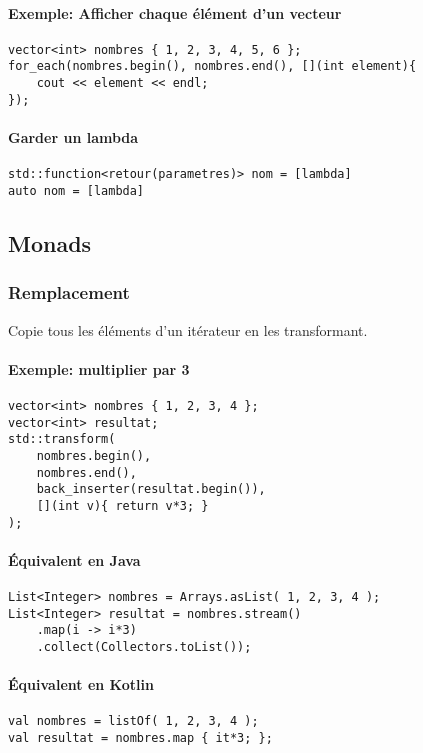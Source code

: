 \documentclass[10pt,a4paper,french]{article}
\begin{document}
\paragraph{Exemple: Afficher chaque élément d'un vecteur}
\begin{verbatim}
vector<int> nombres { 1, 2, 3, 4, 5, 6 };
for_each(nombres.begin(), nombres.end(), [](int element){
    cout << element << endl;
});
\end{verbatim}

\paragraph{Garder un lambda}
\begin{verbatim}
std::function<retour(parametres)> nom = [lambda]
auto nom = [lambda]
\end{verbatim}

\subsection{Monads}

\subsubsection{Remplacement}

Copie tous les éléments d'un itérateur en les transformant.

\paragraph{Exemple: multiplier par 3}
\begin{verbatim}
vector<int> nombres { 1, 2, 3, 4 };
vector<int> resultat;
std::transform(
    nombres.begin(),
    nombres.end(),
    back_inserter(resultat.begin()),
    [](int v){ return v*3; }
);
\end{verbatim}

\paragraph{Équivalent en Java}
\begin{verbatim}
List<Integer> nombres = Arrays.asList( 1, 2, 3, 4 );
List<Integer> resultat = nombres.stream()
    .map(i -> i*3)
    .collect(Collectors.toList());
\end{verbatim}

\paragraph{Équivalent en Kotlin}
\begin{verbatim}
val nombres = listOf( 1, 2, 3, 4 );
val resultat = nombres.map { it*3; };
\end{verbatim}
\end{document}
